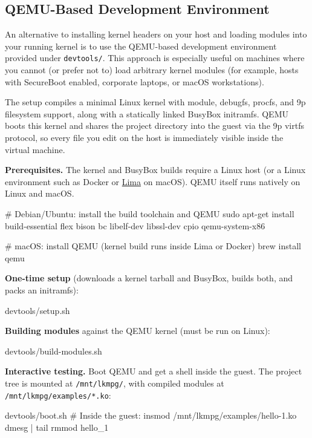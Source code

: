 \documentclass[10pt, oneside]{book}
\begin{document}
\subsection{QEMU-Based Development Environment}
\label{sec:devtools_setup}
An alternative to installing kernel headers on your host and loading modules
into your running kernel is to use the QEMU-based development environment
provided under \verb|devtools/|.
This approach is especially useful on machines where you cannot (or prefer not to)
load arbitrary kernel modules (for example, hosts with SecureBoot enabled, corporate
laptops, or macOS workstations).

The setup compiles a minimal Linux kernel with module, debugfs, procfs, and 9p
filesystem support, along with a statically linked BusyBox initramfs.
QEMU boots this kernel and shares the project directory into the guest via the 9p
virtfs protocol, so every file you edit on the host is immediately visible inside the
virtual machine.

\textbf{Prerequisites.}
The kernel and BusyBox builds require a Linux host (or a Linux environment such as
Docker or \href{https://lima-vm.io/}{Lima} on macOS).
QEMU itself runs natively on Linux and macOS.

\begin{codebash}
# Debian/Ubuntu: install the build toolchain and QEMU
sudo apt-get install build-essential flex bison bc libelf-dev libssl-dev cpio qemu-system-x86

# macOS: install QEMU (kernel build runs inside Lima or Docker)
brew install qemu
\end{codebash}

\textbf{One-time setup} (downloads a kernel tarball and BusyBox, builds both, and
packs an initramfs):
\begin{codebash}
devtools/setup.sh
\end{codebash}

\textbf{Building modules} against the QEMU kernel (must be run on Linux):
\begin{codebash}
devtools/build-modules.sh
\end{codebash}

\textbf{Interactive testing.}
Boot QEMU and get a shell inside the guest.
The project tree is mounted at \verb|/mnt/lkmpg/|, with compiled modules at
\verb|/mnt/lkmpg/examples/*.ko|:
\begin{codebash}
devtools/boot.sh
# Inside the guest:
insmod /mnt/lkmpg/examples/hello-1.ko
dmesg | tail
rmmod hello_1
\end{codebash}
\end{document}
